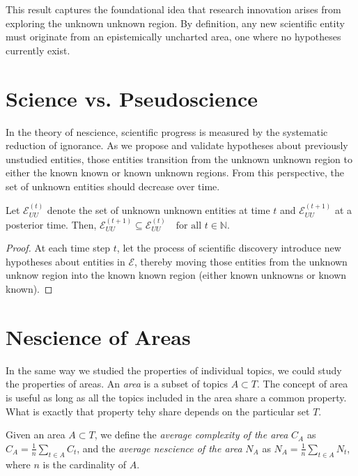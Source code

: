 This result captures the foundational idea that research innovation arises from exploring the unknown unknown region. By definition, any new scientific entity must originate from an epistemically uncharted area, one where no hypotheses currently exist.

%
%

\section{Science vs. Pseudoscience}

In the theory of nescience, scientific progress is measured by the systematic reduction of ignorance. As we propose and validate hypotheses about previously unstudied entities, those entities transition from the unknown unknown region to either the known known or known unknown regions. From this perspective, the set of unknown entities should decrease over time.

\begin{proposition}
Let $\mathcal{E}^{(t)}_{UU}$ denote the set of unknown unknown entities at time $t$ and $\mathcal{E}^{(t+1)}_{UU}$ at a posterior time. Then, $\mathcal{E}^{(t+1)}_{UU} \subseteq \mathcal{E}^{(t)}_{UU} \quad \text{for all } t \in \mathbb{N}$.
\end{proposition}
\begin{proof}
At each time step $t$, let the process of scientific discovery introduce new hypotheses about entities in $\mathcal{E}$, thereby moving those entities from the unknown unknow region into the known known region (either known unknowns or known known).
\end{proof}

%
%

\section{Nescience of Areas}
\label{sec:nescience_areas}

In the same way we studied the properties of individual topics, we could study the properties of areas. An \emph{area} is a subset of topics $A\subset T$. The concept of area is useful as long as all the topics included in the area share a common property. What is exactly that property tehy share depends on the particular set $T$.

\begin{definition}
Given an area $A\subset T$, we define the \emph{average complexity of the area} $C_{A}$ as $C_{A}=\frac{1}{n}\sum_{t\in A}C_{t}$, and the \emph{average nescience of the area} $N_{A}$ as $N_{A}=\frac{1}{n}\sum_{t\in A}N_{t}$, where $n$ is the cardinality of $A$.
\end{definition}

